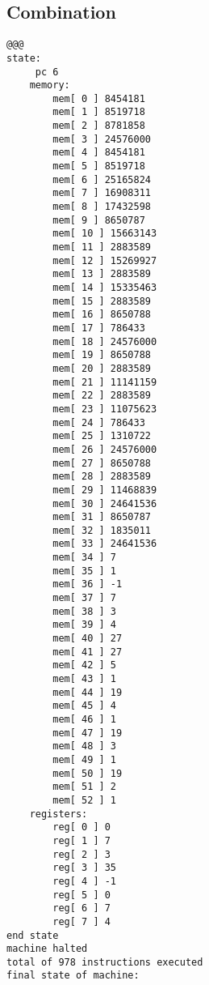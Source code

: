 \documentclass[14pt]{article}
\begin{document}
\subsection{Combination}
\begin{lstlisting}[style=assembly]
@@@
state:
     pc 6
    memory:
        mem[ 0 ] 8454181
        mem[ 1 ] 8519718
        mem[ 2 ] 8781858
        mem[ 3 ] 24576000
        mem[ 4 ] 8454181
        mem[ 5 ] 8519718
        mem[ 6 ] 25165824
        mem[ 7 ] 16908311
        mem[ 8 ] 17432598
        mem[ 9 ] 8650787
        mem[ 10 ] 15663143
        mem[ 11 ] 2883589
        mem[ 12 ] 15269927
        mem[ 13 ] 2883589
        mem[ 14 ] 15335463
        mem[ 15 ] 2883589
        mem[ 16 ] 8650788
        mem[ 17 ] 786433
        mem[ 18 ] 24576000
        mem[ 19 ] 8650788
        mem[ 20 ] 2883589
        mem[ 21 ] 11141159
        mem[ 22 ] 2883589
        mem[ 23 ] 11075623
        mem[ 24 ] 786433
        mem[ 25 ] 1310722
        mem[ 26 ] 24576000
        mem[ 27 ] 8650788
        mem[ 28 ] 2883589
        mem[ 29 ] 11468839
        mem[ 30 ] 24641536
        mem[ 31 ] 8650787
        mem[ 32 ] 1835011
        mem[ 33 ] 24641536
        mem[ 34 ] 7
        mem[ 35 ] 1
        mem[ 36 ] -1
        mem[ 37 ] 7
        mem[ 38 ] 3
        mem[ 39 ] 4
        mem[ 40 ] 27
        mem[ 41 ] 27
        mem[ 42 ] 5
        mem[ 43 ] 1
        mem[ 44 ] 19
        mem[ 45 ] 4
        mem[ 46 ] 1
        mem[ 47 ] 19
        mem[ 48 ] 3
        mem[ 49 ] 1
        mem[ 50 ] 19
        mem[ 51 ] 2
        mem[ 52 ] 1
    registers:
        reg[ 0 ] 0
        reg[ 1 ] 7
        reg[ 2 ] 3
        reg[ 3 ] 35
        reg[ 4 ] -1
        reg[ 5 ] 0
        reg[ 6 ] 7
        reg[ 7 ] 4
end state
machine halted
total of 978 instructions executed
final state of machine:
    

\end{lstlisting}
\end{document}
